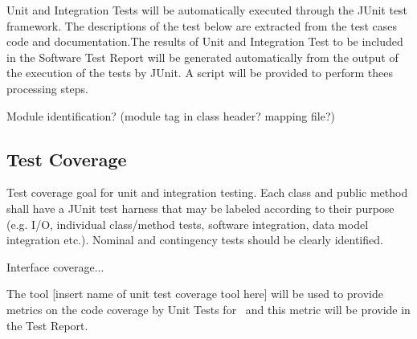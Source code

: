Unit and Integration Tests will be automatically executed through the JUnit test framework. The descriptions of the test below are extracted from the test cases code and documentation.The results of Unit and Integration Test to be included in the Software Test Report will be generated automatically from the output of the execution of the tests by JUnit. A script will be provided to perform thees processing steps.

Module identification? (module tag in class header? mapping file?)

\subsection{Test Coverage}

Test coverage goal for unit and integration testing. Each class and public method shall have a JUnit test harness that may be labeled according to their purpose (e.g. I/O, individual class/method tests, software integration, data model integration etc.). Nominal and contingency
tests should be clearly identified.

Interface coverage...

The tool [insert name of unit test coverage tool here] will be used to provide metrics on the code coverage by Unit Tests for \product \ and this metric will be provide in the Test Report.





